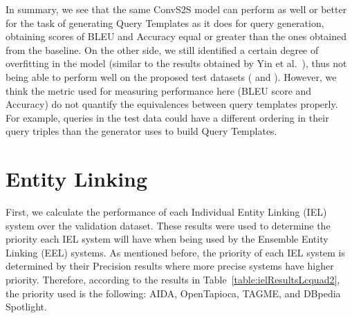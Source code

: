 In summary, we see that the same ConvS2S model can perform as well or better for the task of 
generating Query Templates as it does for \SPARQL{} query generation, obtaining scores of BLEU and 
Accuracy equal or greater than the ones obtained from the baseline. On the other side, we still 
identified a certain degree of overfitting in the model (similar to the results obtained by 
Yin et al.~\cite{nmt:nl-to-sparql-Yin19}), thus not being able to perform well on the proposed 
test datasets (\QALDseven{} and \WikiSPARQL{}). However, we think the metric used for measuring 
performance here (BLEU score and Accuracy) do not quantify the equivalences between query 
templates properly. For example, queries in the test data could have a different ordering in 
their query triples than the generator uses to build Query Templates.

\section{Entity Linking}
\label{cap5:results/entityLinking}
First, we calculate the performance of each Individual Entity Linking (IEL) system over the 
validation \LCQuADtwo{} dataset. These results were used to determine the priority each IEL system 
will have when being used by the Ensemble Entity Linking (EEL) systems. As mentioned before, the 
priority of each IEL system is determined by their Precision results where more precise systems 
have higher priority. Therefore, according to the results in Table~\ref{table:ielResultsLcquad2}, 
the priority used is the following: AIDA, OpenTapioca, TAGME, and DBpedia Spotlight.

